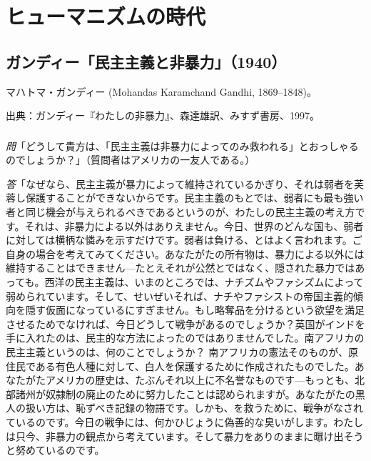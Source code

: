 
\chapter{ヒューマニズムの時代}

\pagebreak{}

\section{ガンディー「民主主義と非暴力」（1940）}


マハトマ・ガンディー (Mohandas Karamchand Gandhi, 1869--1848)。

出典：ガンディー『わたしの非暴力』、森達雄訳、みすず書房、1997。

\subsection{}


\emph{問}「どうして貴方は、「民主主義は非暴力によってのみ救われる」とおっしゃるのでしょうか？」（質問者はアメリカの一友人である。）



\emph{答}「なぜなら、民主主義が暴力によって維持されているかぎり、それは弱者を芙蓉し保護することができないからです。民主主義のもとでは、弱者にも最も強い者と同じ機会が与えられるべきであるというのが、わたしの民主主義の考え方です。それは、非暴力による以外はありえません。今日、世界のどんな国も、弱者に対しては横柄な憐みを示すだけです。弱者は負ける、とはよく言われます。ご自身の場合を考えてみてください。あなたがたの所有物は、暴力による以外には維持することはできません{\——}たとえそれが公然とではなく、隠された暴力ではあっても。西洋の民主主義は、いまのところでは、ナチズムやファシズムによって弱められています。そして、せいぜいそれば、ナチやファシストの帝国主義的傾向を隠す仮面になっているにすぎません。もし略奪品を分けるという欲望を満足させるためでなければ、今日どうして戦争があるのでしょうか？英国がインドを手に入れたのは、民主的な方法によったのではありませんでした。南アフリカの民主主義というのは、何のことでしょうか？ 南アフリカの憲法そのものが、原住民である有色人種に対して、白人を保護するために作成されたものでした。あなたがたアメリカの歴史は、たぶんそれ以上に不名誉なものです{\——}もっとも、北部諸州が奴隷制の廃止のために努力したことは認められますが。あなたがたの黒人の扱い方は、恥ずべき記録の物語です。しかも、を救うために、戦争がなされているのです。今日の戦争には、何かひじょうに偽善的な臭いがします。わたしは只今、非暴力の観点から考えています。そして暴力をありのままに曝け出そうと努めているのです。

